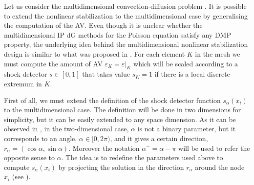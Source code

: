 Let us consider the multidimensional convection-diffusion problem . It is possible to extend the nonlinear stabilization to the multidimensional case by generalising the computation of the AV. Even though it is unclear whether the multidimensional IP dG methods for the Poisson equation satisfy any DMP property, the underlying idea behind the multidimensional nonlinear stabilization design is similar to what was proposed in \cite{ourpaper}. For each element $K$ in the mesh we must compute the amount of AV $\varepsilon_K = \varepsilon|_K$ which will be scaled according to a shock detector $s\in[0,1]$ that takes value $s_K=1$ if there is a local discrete extremum in $K$. 

First of all, we must extend the definition of the shock detector function $s_\alpha(x_i)$ to the multidimensional case. The definition will be done in two dimensions for simplicity, but it can be easily extended to any space dimension. As it can be observed in , in the two-dimensional case, $\alpha$ is not a binary parameter, but it corresponds to an angle,  $\alpha \in [0,2\pi)$, and it gives a certain direction, $r_\alpha =(\cos \alpha, \sin \alpha)$. Moreover the notation $\alpha^- = \alpha - \pi $ will be used to refer the opposite sense to $\alpha$. The idea is to redefine the parameters used above to compute $s_\alpha(x_i)$ by projecting the solution in the direction $r_\alpha$ around the node $x_i$ (see  ).

